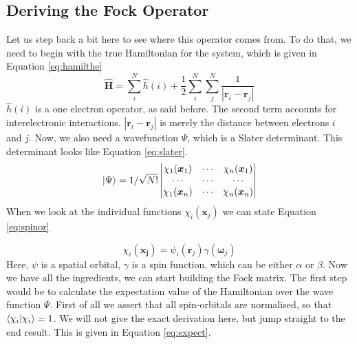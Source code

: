 \subsection{Deriving the Fock Operator}
\label{subsec:fock matrix}
Let us step back a bit here to see where this operator comes from. To do that, we 
need to begin with the true Hamiltonian for the system, which is given in Equation 
\ref{eq:hamilthe}
\begin{equation}\label{eq:hamilthe}
    \hat{\boldsymbol{H}} = \sum_i^N\hat{h}(i) + \frac{1}{2}\sum_i^N\sum_j^N\frac{1}{|\boldsymbol{r}_i - \boldsymbol{r}_j|}
\end{equation}
$\hat{h}(i)$ is a one electron operator, as said before. The second term accounts 
for interelectronic interactions. $|\boldsymbol{r}_i - \boldsymbol{r}_j|$ is 
merely the distance between electrons $i$ and $j$. Now, we also need a 
wavefunction $\Psi$, which is a Slater determinant. This determinant looks like 
Equation \ref{eq:slater}.
\begin{equation}\label{eq:slater}
    \ket{\Psi} = 1/\sqrt{N!}\begin{vmatrix}
        \chi_1(\boldsymbol{x}_1) & \cdots & \chi_n(\boldsymbol{x}_1) \\
        \cdots & \cdots & \cdots \\
        \chi_1(\boldsymbol{x}_n) & \cdots & \chi_n(\boldsymbol{x}_n)\\
    \end{vmatrix}
\end{equation}
When we look at the individual functions $\chi_i(\boldsymbol{x}_j)$ we can state Equation 
\ref{eq:spinor}

\begin{equation}\label{eq:spinor}
    \chi_i(\boldsymbol{x_j}) = \psi_i(\boldsymbol{r}_j)\gamma(\boldsymbol{\omega}_j)
\end{equation}
Here, $\psi$ is a spatial orbital, $\gamma$ is a spin function, which can be either
$\alpha$ or $\beta$. Now we have all the ingredients, we can start building the Fock
matrix. The first step would be to calculate the expectation value of the 
Hamiltonian over the wave function $\Psi$. First of all we assert that all spin-orbitals
are normalised, so that $\braket{\chi_i}{\chi_i} = 1$. We will not give the exact 
derivation here, but jump straight to the end result. This is given in Equation 
\ref{eq:expect}.

